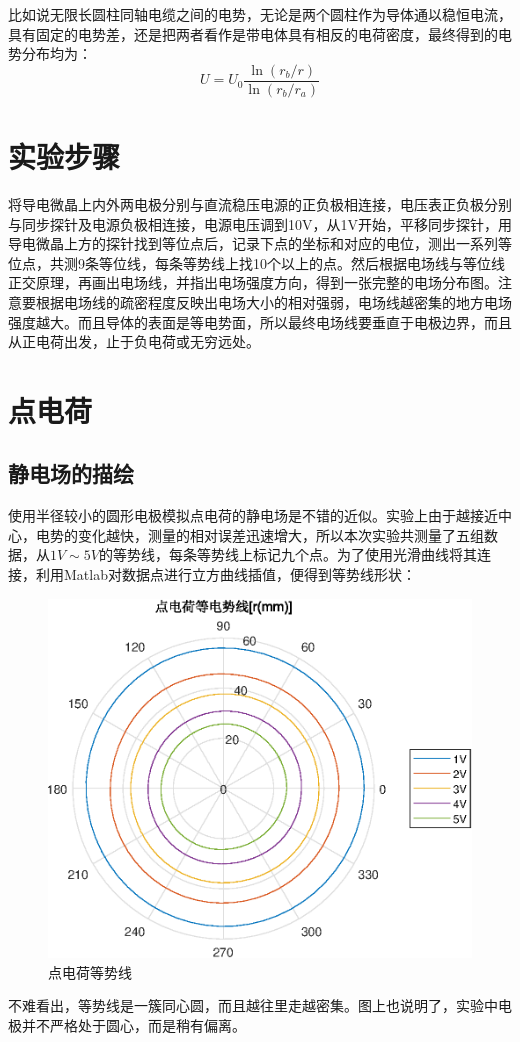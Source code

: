 \documentclass{WHUReport}
\begin{document}
\begin{multicols}{2}
	比如说无限长圆柱同轴电缆之间的电势，无论是两个圆柱作为导体通以稳恒电流，具有固定的电势差，还是把两者看作是带电体具有相反的电荷密度，最终得到的电势分布均为：
	\begin{equation}
		U=U_0\frac{\ln(r_b/r)}{\ln(r_b/r_a)}
	\end{equation}
	\section{实验步骤}
	将导电微晶上内外两电极分别与直流稳压电源的正负极相连接，电压表正负极分别与同步探针及电源负极相连接，电源电压调到10V，从1V开始，平移同步探针，用导电微晶上方的探针找到等位点后，记录下点的坐标和对应的电位，测出一系列等位点，共测9条等位线，每条等势线上找10个以上的点。然后根据电场线与等位线正交原理，再画出电场线，并指出电场强度方向，得到一张完整的电场分布图。注意要根据电场线的疏密程度反映出电场大小的相对强弱，电场线越密集的地方电场强度越大。而且导体的表面是等电势面，所以最终电场线要垂直于电极边界，而且从正电荷出发，止于负电荷或无穷远处。
	\section{点电荷}
	\subsection{静电场的描绘}
	使用半径较小的圆形电极模拟点电荷的静电场是不错的近似。实验上由于越接近中心，电势的变化越快，测量的相对误差迅速增大，所以本次实验共测量了五组数据，从$1V\sim5V$的等势线，每条等势线上标记九个点。为了使用光滑曲线将其连接，利用Matlab对数据点进行立方曲线插值，便得到等势线形状：
	\begin{figure}[H]
		\centering
		\includegraphics[width=0.85\linewidth]{figs/point_charge.eps}
		\caption{点电荷等势线}
	\end{figure}
	不难看出，等势线是一簇同心圆，而且越往里走越密集。图上也说明了，实验中电极并不严格处于圆心，而是稍有偏离。
	

\end{multicols}
\end{document}
